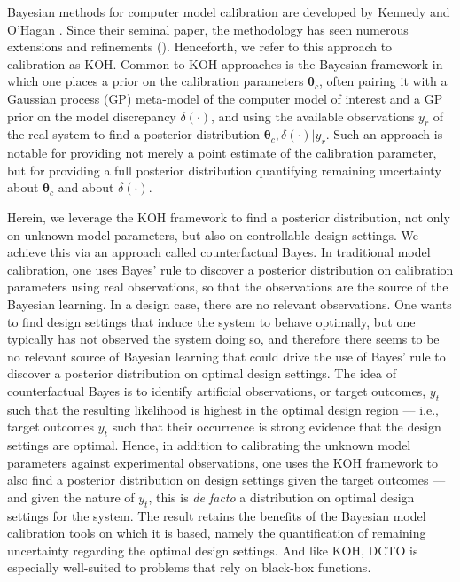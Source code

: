 \documentclass[twocolumn,10pt]{asme2ej}
\begin{document}
%
Bayesian methods for computer model calibration are developed by Kennedy and O'Hagan \cite{Kennedy2001}.
%
Since their seminal paper, the methodology has seen numerous extensions and refinements (\cite{Higdon2004,Williams2006,Bayarri2007a,Bayarri2007b,Paulo2012,Brynjarsdottir2014}).
%
Henceforth, we refer to this approach to calibration as KOH.
%
Common to KOH approaches is the Bayesian framework in which one places a prior on the calibration parameters $\boldsymbol \theta_c$, often pairing it with a Gaussian process (GP) meta-model of the computer model of interest and a GP prior on the model discrepancy $\delta(\cdot)$, and using the available observations $y_r$ of the real system to find a posterior distribution $\boldsymbol\theta_c,\delta(\cdot)|y_r$.
%
Such an approach is notable for providing not merely a point estimate of the calibration parameter, but for providing a full posterior distribution quantifying remaining uncertainty about $\boldsymbol\theta_c$ and about $\delta(\cdot)$.
%

%
Herein, we leverage the KOH framework to find a posterior distribution, not only on unknown model parameters, but also on controllable design settings.
%
We achieve this via an approach called counterfactual Bayes.
%
In traditional model calibration, one uses Bayes' rule to discover a posterior distribution on calibration parameters using real observations, so that the observations are the source of the Bayesian learning.
%
In a design case, there are no relevant observations.
%
One wants to find design settings that induce the system to behave optimally, but one typically has not observed the system doing so, and therefore there seems to be no relevant source of Bayesian learning that could drive the use of Bayes' rule to discover a posterior distribution on optimal design settings.
%
The idea of counterfactual Bayes is to identify artificial observations, or target outcomes, $y_t$ such that the resulting likelihood is highest in the optimal design region --- i.e., target outcomes $y_t$ such that their occurrence is strong evidence that the design settings are optimal.
%
Hence, in addition to calibrating the unknown model parameters against experimental observations, one uses the KOH framework to also find a posterior distribution on design settings given the target outcomes --- and given the nature of $y_t$, this is \textit{de facto} a distribution on optimal design settings for the system.
%
The result retains the benefits of the Bayesian model calibration tools on which it is based, namely the quantification of remaining uncertainty regarding the optimal design settings.
%
And like KOH, DCTO is especially well-suited to problems that rely on black-box functions.
%
\end{document}
